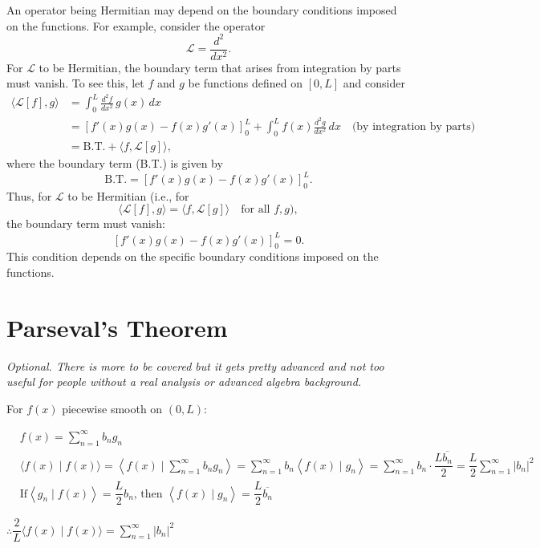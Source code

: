 \documentclass{report}
\begin{document}
An operator being Hermitian may depend on the boundary conditions imposed on the functions. For example, consider the operator
\[
\mathcal{L} = \frac{d^2}{dx^2}.
\]
For \(\mathcal{L}\) to be Hermitian, the boundary term that arises from integration by parts must vanish. To see this, let \(f\) and \(g\) be functions defined on \([0,L]\) and consider
\begin{align*}
\langle \mathcal{L}[f], g \rangle &= \int_0^L \frac{d^2 f}{dx^2}\, g(x)\, dx \\
&= \left[ f'(x) g(x) - f(x) g'(x) \right]_{0}^{L} + \int_0^L f(x) \frac{d^2 g}{dx^2}\, dx \quad \text{(by integration by parts)} \\
&= \text{B.T.} + \langle f, \mathcal{L}[g] \rangle,
\end{align*}
where the boundary term (B.T.) is given by
\[
\text{B.T.} = \left[ f'(x) g(x) - f(x) g'(x) \right]_{0}^{L}.
\]
Thus, for \(\mathcal{L}\) to be Hermitian (i.e., for
\[
\langle \mathcal{L}[f], g \rangle = \langle f, \mathcal{L}[g] \rangle \quad \text{for all } f, g),
\]
the boundary term must vanish:
\[
\left[ f'(x) g(x) - f(x) g'(x) \right]_{0}^{L} = 0.
\]
This condition depends on the specific boundary conditions imposed on the functions.


\section{Parseval's Theorem}

\emph{Optional. There is more to be covered but it gets pretty advanced and not too useful for people without a real analysis or advanced algebra background.}

For $f(x)$ piecewise smooth on $(0, L)$:

$
\begin{aligned}
& f(x)=\sum\limits_{n=1}^{\infty} b_{n} g_{n} \\
& \langle f(x) \mid f(x)\rangle=\left\langle f(x) \mid \sum\limits_{n=1}^{\infty} b_{n} g_{n}\right\rangle=\sum\limits_{n=1}^{\infty} b_{n}\left\langle f(x) \mid g_{n}\right\rangle=\sum\limits_{n=1}^{\infty} b_{n} \cdot \dfrac{L \overline{b_{n}}}{2}=\dfrac{L}{2} \sum\limits_{n=1}^{\infty}\left|b_{n}\right|^{2} \\
& \text{If} \left\langle g_{n} \mid f(x)\right\rangle=\dfrac{L}{2} b_{n} \text {, then }\left\langle f(x) \mid g_{n}\right\rangle=\dfrac{L}{2} \overline{b_{n}}
\end{aligned}
$

$\therefore \dfrac{2}{L}\langle f(x) \mid f(x)\rangle=\sum\limits_{n=1}^{\infty}\left|b_{n}\right|^{2}$
\end{document}
